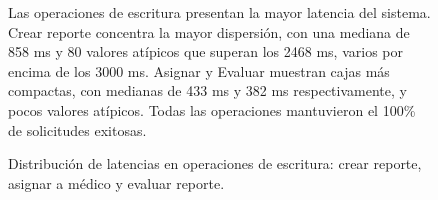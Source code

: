 \begin{figure}[H]
\begin{minipage}{0.55\textwidth}
    \end{minipage}
    \hfill
    \begin{minipage}{0.40\textwidth}
       \small
Las operaciones de escritura presentan la mayor latencia del sistema. Crear reporte concentra la mayor dispersión, con una mediana de 858 ms y 80 valores atípicos que superan los 2468 ms, varios por encima de los 3000 ms. Asignar y Evaluar muestran cajas más compactas, con medianas de 433 ms y 382 ms respectivamente, y pocos valores atípicos. Todas las operaciones mantuvieron el 100\% de solicitudes exitosas.
\end{minipage}
    \caption{Distribución de latencias en operaciones de escritura: crear reporte, asignar a médico y evaluar reporte.}
    \label{fig:boxplot-command}
\end{figure}




